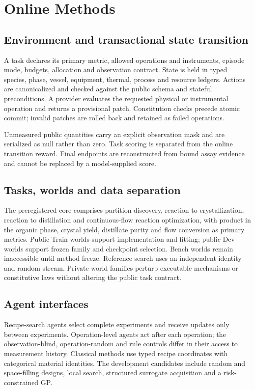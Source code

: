 \documentclass[11pt]{article}
\begin{document}
\section*{Online Methods}

\subsection*{Environment and transactional state transition}

A task declares its primary metric, allowed operations and instruments, episode mode, budgets, allocation and observation contract. State is held in typed species, phase, vessel, equipment, thermal, process and resource ledgers. Actions are canonicalized and checked against the public schema and stateful preconditions. A provider evaluates the requested physical or instrumental operation and returns a provisional patch. Constitution checks precede atomic commit; invalid patches are rolled back and retained as failed operations.

Unmeasured public quantities carry an explicit observation mask and are serialized as null rather than zero. Task scoring is separated from the online transition reward. Final endpoints are reconstructed from bound assay evidence and cannot be replaced by a model-supplied score.

\subsection*{Tasks, worlds and data separation}

The preregistered core comprises partition discovery, reaction to crystallization, reaction to distillation and continuous-flow reaction optimization, with product in the organic phase, crystal yield, distillate purity and flow conversion as primary metrics. Public Train worlds support implementation and fitting; public Dev worlds support frozen family and checkpoint selection. Bench worlds remain inaccessible until method freeze. Reference search uses an independent identity and random stream. Private world families perturb executable mechanisms or constitutive laws without altering the public task contract.

\subsection*{Agent interfaces}

Recipe-search agents select complete experiments and receive updates only between experiments. Operation-level agents act after each operation; the observation-blind, operation-random and rule controls differ in their access to measurement history. Classical methods use typed recipe coordinates with categorical material identities. The development candidates include random and space-filling designs, local search, structured surrogate acquisition and a risk-constrained GP.
\end{document}
